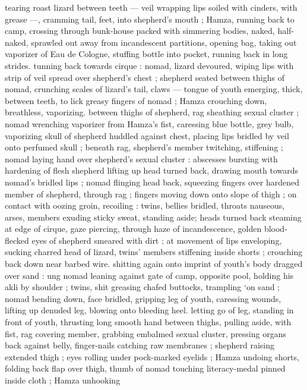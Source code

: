 tearing roast lizard between teeth --- veil wrapping lips soiled with 
cinders, with grease ---, cramming tail, feet, into shepherd's mouth 
; Hamza, running back to camp, crossing through bunk-house packed 
with simmering bodies, naked, half-naked, sprawled out away from 
incandescent partitions, opening bag, taking out vaporizer of Eau de 
Cologne, stuffing bottle into pocket, running back in long strides. 
tunning back towards cirque : nomad, lizard devoured, wiping lips 
with strip of veil spread over shepherd's chest ; shepherd seated 
between thighs of nomad, crunching scales of lizard's tail, claws --- 
tongue of youth emerging, thick, between teeth, to lick greasy 
fingers of nomad ; Hamza crouching down, breathless, vaporizing. 
between thighs of shepherd, rag sheathing sexual cluster ; nomad 
wrenching vaporizer from Hamza's fist, caressing blue bottle, grey 
bulb, vaporizing skull of shepherd huddled against chest, placing 
lips bridled by veil onto perfumed skull ; beneath rag, shepherd's 
member twitching, stiffening ; nomad laying hand over shepherd's 
sexual cluster : abscesses bursting with hardening of flesh 
shepherd lifting up head turned back, drawing mouth towards 
nomad's bridled lips ; nomad flinging head back, squeezing fingers 
over hardened member of shepherd, through rag ; fingers moving 
down onto slope of thigh ; on contact with oozing groin, recoiling : 
twins, bellies bridled, throats nauseous, arses, members exuding 
sticky sweat, standing aside; heads turned back steaming at edge of 
cirque, gaze piercing, through haze of incandescence, golden blood- 
flecked eyes of shepherd smeared with dirt ; at movement of lips 
enveloping, sucking charred head of lizard, twins' members 
stiffening inside shorts ; crouching back down near barbed wire. 
shitting again onto imprint of youth's body dragged over sand : 
ung nomad leaning against gate of camp, opposite pool, holding 
his akli by shoulder ; twins, shit greasing chafed buttocks, trampling 
‘on sand ; nomad bending down, face bridled, gripping leg of youth, 
caressing wounds, lifting up denuded leg, blowing onto bleeding 
heel. letting go of leg, standing in front of youth, thrusting long 
smooth hand between thighs, pulling aside, with fist, rag covering 
member, grabbing embalmed sexual cluster, pressing organs back 
against belly, finger-nails catching raw membranes ; shepherd raising 
extended thigh ; eyes rolling under pock-marked eyelids ; Hamza 
undoing shorts, folding back flap over thigh, thumb of nomad 
touching literacy-medal pinned inside cloth ; Hamza unhooking 

